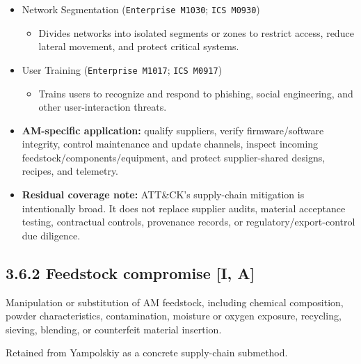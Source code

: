 \documentclass[10pt,a4paper,oneside]{report}
\begin{document}
\begin{itemize}
\begin{itemize}
\begin{itemize}
\item Records and reviews activity, permissions, configurations, and integrity indicators to identify weaknesses or anomalies.
\end{itemize}
\item Network Segmentation (\texttt{Enterprise M1030}; \texttt{ICS M0930})
\begin{itemize}
\item Divides networks into isolated segments or zones to restrict access, reduce lateral movement, and protect critical systems.
\end{itemize}
\item User Training (\texttt{Enterprise M1017}; \texttt{ICS M0917})
\begin{itemize}
\item Trains users to recognize and respond to phishing, social engineering, and other user-interaction threats.
\end{itemize}
\end{itemize}
\end{itemize}

\begin{itemize}
\item \textbf{AM-specific application:} qualify suppliers, verify firmware/software integrity, control maintenance and update channels, inspect incoming feedstock/components/equipment, and protect supplier-shared designs, recipes, and telemetry.
\end{itemize}

\begin{itemize}
\item \textbf{Residual coverage note:} ATT\&CK's supply-chain mitigation is intentionally broad. It does not replace supplier audits, material acceptance testing, contractual controls, provenance records, or regulatory/export-control due diligence.
\end{itemize}


\subsection{3.6.2 Feedstock compromise [I, A]}


Manipulation or substitution of AM feedstock, including chemical composition, powder characteristics, contamination, moisture or oxygen exposure, recycling, sieving, blending, or counterfeit material insertion.

Retained from Yampolskiy as a concrete supply-chain submethod.
\end{document}
